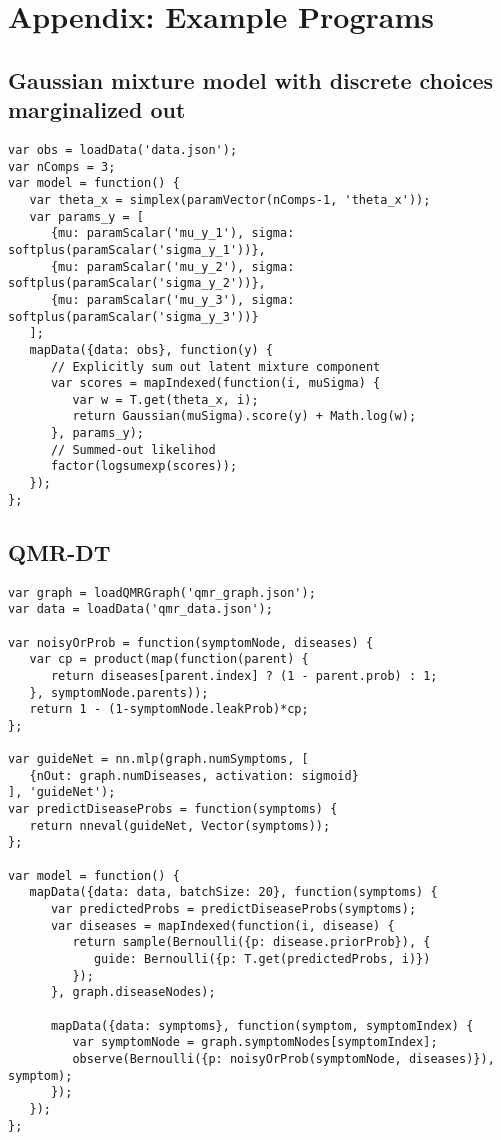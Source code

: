 \section{Appendix: Example Programs}
\label{sec:appendix_code}


\subsection{Gaussian mixture model with discrete choices marginalized out}
\label{sec:appendix_code:gmmSumOut}

\begin{lstlisting}
var obs = loadData('data.json');
var nComps = 3;
var model = function() {
   var theta_x = simplex(paramVector(nComps-1, 'theta_x'));
   var params_y = [
      {mu: paramScalar('mu_y_1'), sigma: softplus(paramScalar('sigma_y_1'))},
      {mu: paramScalar('mu_y_2'), sigma: softplus(paramScalar('sigma_y_2'))},
      {mu: paramScalar('mu_y_3'), sigma: softplus(paramScalar('sigma_y_3'))}
   ];
   mapData({data: obs}, function(y) {
      // Explicitly sum out latent mixture component
      var scores = mapIndexed(function(i, muSigma) {
         var w = T.get(theta_x, i);
         return Gaussian(muSigma).score(y) + Math.log(w);
      }, params_y);
      // Summed-out likelihod
      factor(logsumexp(scores));
   });
};
\end{lstlisting}

\subsection{QMR-DT}
\label{sec:appendix_code:qmr}

\begin{lstlisting}
var graph = loadQMRGraph('qmr_graph.json');
var data = loadData('qmr_data.json');

var noisyOrProb = function(symptomNode, diseases) {
   var cp = product(map(function(parent) {
      return diseases[parent.index] ? (1 - parent.prob) : 1;
   }, symptomNode.parents));
   return 1 - (1-symptomNode.leakProb)*cp;
};

var guideNet = nn.mlp(graph.numSymptoms, [
   {nOut: graph.numDiseases, activation: sigmoid}
], 'guideNet');
var predictDiseaseProbs = function(symptoms) {
   return nneval(guideNet, Vector(symptoms));
};

var model = function() {
   mapData({data: data, batchSize: 20}, function(symptoms) {
      var predictedProbs = predictDiseaseProbs(symptoms);
      var diseases = mapIndexed(function(i, disease) {
         return sample(Bernoulli({p: disease.priorProb}), {
            guide: Bernoulli({p: T.get(predictedProbs, i)})
         });
      }, graph.diseaseNodes);

      mapData({data: symptoms}, function(symptom, symptomIndex) {
         var symptomNode = graph.symptomNodes[symptomIndex];
         observe(Bernoulli({p: noisyOrProb(symptomNode, diseases)}), symptom);
      });
   });
};
\end{lstlisting}

